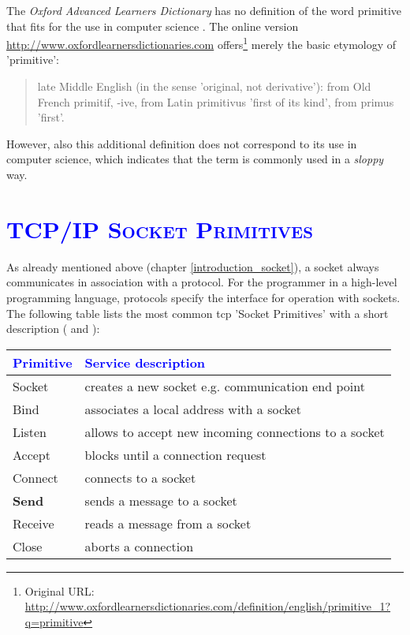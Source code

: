 \documentclass[xcolor=dvipsnames]{article}
\begin{document}
\noindent The \textit{Oxford Advanced Learners Dictionary} has no definition of the word primitive that fits for the use in computer science \cite[p. 1197]{oxford_dictionary}. The online version \url{http://www.oxfordlearnersdictionaries.com} offers\footnote{Original URL: \url{http://www.oxfordlearnersdictionaries.com/definition/english/primitive_1?q=primitive}} merely the basic etymology of 'primitive':

\begin{quote}
late Middle English (in the sense 'original, not derivative'): from Old French primitif, -ive, from Latin primitivus 'first of its kind', from primus 'first'.
\end{quote}

\noindent However, also this additional definition does not correspond to its use in computer science, which indicates that the term is commonly used in a \textit{sloppy} way. 

\section{\scshape{\textcolor{blue}{TCP/IP Socket Primitives}}} \label{socket_primitives}

As already mentioned above (chapter \ref{introduction_socket}), a socket always communicates in association with a protocol. For the programmer in a high-level programming language, protocols specify the interface for operation with sockets.\\

\noindent The following table lists the most common \gls{tcp} 'Socket Primitives' with a short description (\cite{IBM_Anupama} and \cite[p. 142, ch. 4.3.1]{tanenbaum}):\\

\begin{center}
\begin{tabular}{ | l | l | } 
\hline
\textcolor{blue}{Primitive} & \textcolor{blue}{Service description}\\
\hline
Socket & creates a new socket e.g. communication end point\\
Bind & associates a local address with a socket\\
Listen & allows to accept new incoming connections to a socket\\
Accept & blocks until a connection request\\
Connect & connects to a socket\\
\textbf{Send} & sends a message to a socket\\
Receive & reads a message from a socket\\
Close & aborts a connection\\
\hline
\end{tabular}
\end{center}
\label{tab:tcp_primitives}
\end{document}

